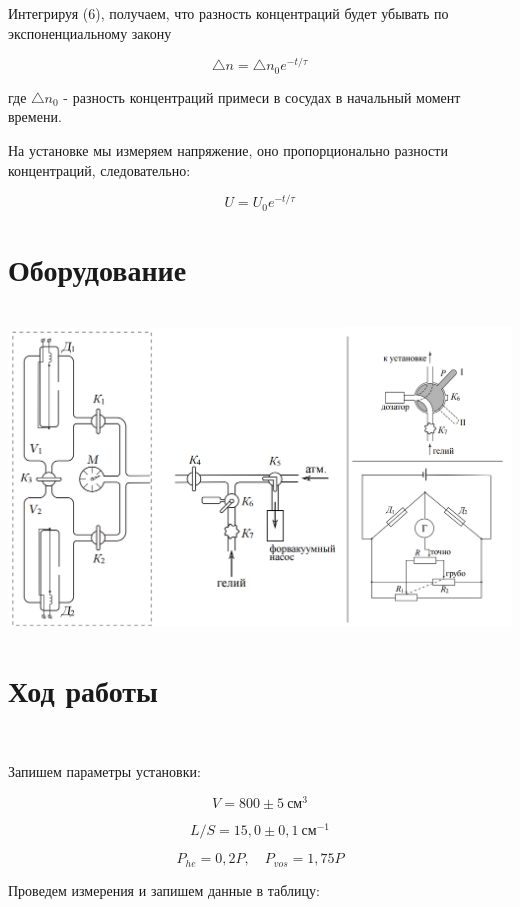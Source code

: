 \documentclass[11pt]{article}
\begin{document}
Интегрируя (6), получаем, что разность концентраций будет убывать по экспоненциальному закону

\begin{equation}
\bigtriangleup n = \bigtriangleup n_0 e^{-t/\tau}
\end{equation}

где $\bigtriangleup n_0$ - разность концентраций примеси в сосудах в начальный момент
времени.

На установке мы измеряем напряжение, оно пропорционально разности концентраций, следовательно:

\begin{equation}
U = U_0 e^{-t/\tau}
\end{equation}

\section*{Оборудование}\
\includegraphics[scale=0.4]{pic1.png}

\newpage

\section*{Ход работы}\

\vspace{0.5cm}

Запишем параметры установки:

\[V = 800 \pm 5 \: \textit{см}^3\]

\[L/S = 15,0 \pm 0,1 \: \textit{см}^{-1}\]

\[P_{he} = 0,2 P, \quad P_{vos} = 1,75 P\]

Проведем измерения и запишем данные в таблицу:

\vspace{0.5cm}
\end{document}
